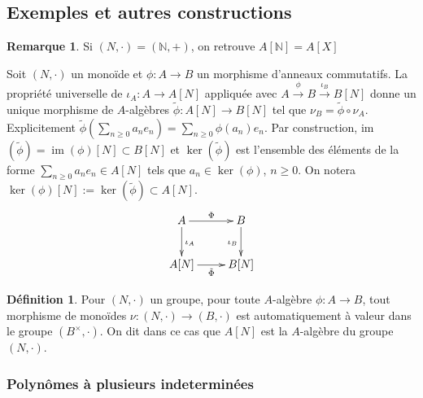 \documentclass[a4paper, oneside, 12pt]{book}
\theoremstyle{theoremeStyle} %
\theoremstyle{definition} %
\newtheorem{definition}[theoreme]{Définition}
\newtheorem{remarque}[theoreme]{Remarque}
\DeclareMathOperator{\im}{im}
\newcommand{\N}{\mathbb{N}}
\begin{document}
\subsection{Exemples et autres constructions}

  \begin{remarque}Si $(N,\cdot)=(\N,+)$, on retrouve $A[\N]=A[X]$\end{remarque}

  Soit $(N,\cdot)$ un monoïde et $\phi: A\rightarrow B$ un morphisme d'anneaux commutatifs. La propriété universelle de $\iota_A:A\rightarrow A[N]$ appliquée avec $A\stackrel{\phi}{\rightarrow} B\stackrel{\iota_B}{\rightarrow} B[N]$ donne un unique morphisme de $A$-algèbres $\tilde{\phi}:A[N]\rightarrow B[N]$ tel que $\nu_B=\tilde{\phi}\circ \nu_A$. Explicitement $\tilde{\phi}(\sum_{n\geq 0}a_ne_n)=\sum_{n\geq 0}\phi(a_n)e_n$.  Par construction, im$(\tilde{\phi})=\im(\phi)[N]\subset B[N]$ et $\ker(\tilde{\phi})$ est l'ensemble des éléments de la forme $\sum_{n\geq 0}a_ne_n\in A[N]$ tels que $a_n\in \ker(\phi)$, $n\geq 0$. On notera $\ker(\phi)[N]:=\ker(\tilde{\phi})\subset A[N]$.\\

	$$ \xymatrix{ A\ar[r]^\Phi \ar[d]^{\iota_A} & B \ar[d]_{\iota_B} \\ A[N]\ar[r]_{\tilde{\Phi} } & B[N] } $$
\begin{definition}Pour $(N,\cdot)$ un groupe, pour toute $A$-algèbre $\phi:A\rightarrow B$, tout morphisme de monoïdes $\nu:(N,\cdot)\rightarrow (B,\cdot)$ est automatiquement à valeur dans le groupe $(B^\times,\cdot)$. On dit dans ce cas que $ A[N]$ est la $A$-algèbre du groupe $(N,\cdot)$.\end{definition}

	\subsubsection{Polynômes à plusieurs indeterminées}
\end{document}
